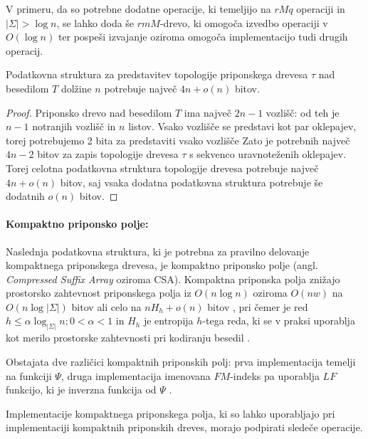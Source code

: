 V primeru, da so potrebne dodatne operacije, ki temeljijo na $rMq$ operaciji in $|\Sigma|>\log{n}$, se lahko doda še $rmM$-drevo, ki omogoča izvedbo operaciji v $O(\log{n})$ ter pospeši izvajanje oziroma omogoča implementacijo tudi drugih operacij.

\begin{lema}\label{lema:BP}
 Podatkovna struktura za predstavitev topologije priponskega drevesa $\tau$ nad besedilom $T$ dolžine $n$ potrebuje največ $4n+o(n)$ bitov.
\end{lema}

\begin{proof}
Priponsko drevo nad besedilom $T$ ima največ $2n-1$ vozlišč: od teh je $n-1$ notranjih vozlišč in $n$ listov. Vsako vozlišče se predstavi kot par oklepajev, torej potrebujemo 2 bita za predstaviti vsako vozlišče Zato je potrebnih največ $4n-2$ bitov za zapis topologije drevesa $\tau$ s sekvenco uravnoteženih oklepajev. Torej celotna podatkovna struktura topologije drevesa potrebuje največ $4n+o(n)$ bitov, saj vsaka dodatna podatkovna struktura potrebuje še dodatnih $o(n)$ bitov.
\end{proof}

\paragraph{Kompaktno priponsko polje:}
Naslednja podatkovna struktura, ki je potrebna za pravilno delovanje kompaktnega priponskega drevesa, je kompaktno priponsko polje (angl. \textit{Compressed Suffix Array} oziroma CSA). Kompaktna priponska polja znižajo prostorsko zahtevnost priponskega polja iz $O(n\log{n})$ oziroma $O(nw)$ na $O(n\log{|\Sigma|})$ bitov \cite{Grossi2000} ali celo na $nH_h +o(n)$ bitov \cite{Grossi2003}, pri čemer je red $h\le\alpha\log_{|\Sigma|}{n};0<\alpha<1$ in $H_h$ je entropija $h$-tega reda, ki se v praksi uporablja kot merilo prostorske zahtevnosti pri kodiranju besedil \cite{Navarro2016}.

Obstajata dve različici kompaktnih priponskih polj: prva implementacija temelji na funkciji $\Psi$, druga implementacija imenovana $FM$-indeks pa uporablja $LF$ funkcijo, ki je inverzna funkcija od $\Psi$ \cite{Navarro2016, Sadakane2007}.

Implementacije kompaktnega priponskega polja, ki so lahko uporabljajo pri implementaciji kompaktnih priponskih dreves, morajo podpirati sledeče operacije.

